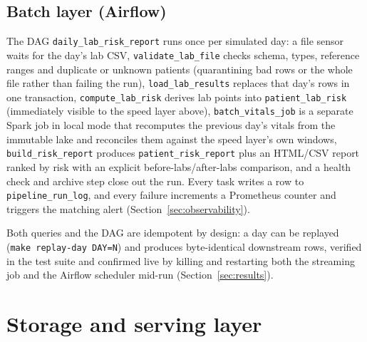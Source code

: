\documentclass[11pt,a4paper]{article}
\newcommand{\code}[1]{\texttt{\small #1}}
\begin{document}
\subsection{Batch layer (Airflow)}

The DAG \code{daily\_lab\_risk\_report} runs once per simulated day: a file sensor waits for the
day's lab CSV, \code{validate\_lab\_file} checks schema, types, reference ranges and duplicate or
unknown patients (quarantining bad rows or the whole file rather than failing the run),
\code{load\_lab\_results} replaces that day's rows in one transaction, \code{compute\_lab\_risk}
derives lab points into \code{patient\_lab\_risk} (immediately visible to the speed layer above),
\code{batch\_vitals\_job} is a separate Spark job in local mode that recomputes the previous day's
vitals from the immutable lake and reconciles them against the speed layer's own windows,
\code{build\_risk\_report} produces \code{patient\_risk\_report} plus an HTML/CSV report ranked by
risk with an explicit before-labs/after-labs comparison, and a health check and archive step close
out the run. Every task writes a row to \code{pipeline\_run\_log}, and every failure increments a
Prometheus counter and triggers the matching alert (Section~\ref{sec:observability}).

Both queries and the DAG are idempotent by design: a day can be replayed (\code{make replay-day
DAY=N}) and produces byte-identical downstream rows, verified in the test suite and confirmed live by
killing and restarting both the streaming job and the Airflow scheduler mid-run
(Section~\ref{sec:results}).

\section{Storage and serving layer}
\end{document}
